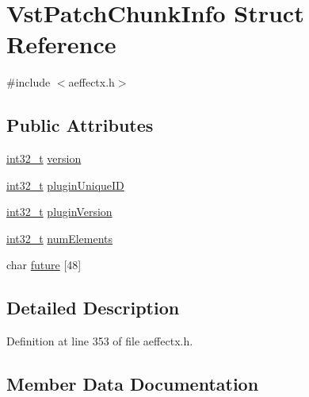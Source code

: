 \hypertarget{struct_vst_patch_chunk_info}{}\section{Vst\+Patch\+Chunk\+Info Struct Reference}
\label{struct_vst_patch_chunk_info}


{\ttfamily \#include $<$aeffectx.\+h$>$}

\subsection*{Public Attributes}
\begin{DoxyCompactItemize}
\item 
\hyperlink{lib-src_2ffmpeg_2win32_2stdint_8h_a37994e3b11c72957c6f454c6ec96d43d}{int32\+\_\+t} \hyperlink{struct_vst_patch_chunk_info_a09942223afdb9472fadab3247692cc1c}{version}
\item 
\hyperlink{lib-src_2ffmpeg_2win32_2stdint_8h_a37994e3b11c72957c6f454c6ec96d43d}{int32\+\_\+t} \hyperlink{struct_vst_patch_chunk_info_a7a968db1f6b30561989659502d10af61}{plugin\+Unique\+ID}
\item 
\hyperlink{lib-src_2ffmpeg_2win32_2stdint_8h_a37994e3b11c72957c6f454c6ec96d43d}{int32\+\_\+t} \hyperlink{struct_vst_patch_chunk_info_ade69ca2bcd8e9f93743380608009f4f3}{plugin\+Version}
\item 
\hyperlink{lib-src_2ffmpeg_2win32_2stdint_8h_a37994e3b11c72957c6f454c6ec96d43d}{int32\+\_\+t} \hyperlink{struct_vst_patch_chunk_info_aa8db76cc9a4a3c018bf8a96c09300a5e}{num\+Elements}
\item 
char \hyperlink{struct_vst_patch_chunk_info_af5bd20dc50aeebdda63c65d5573b4926}{future} \mbox{[}48\mbox{]}
\end{DoxyCompactItemize}


\subsection{Detailed Description}


Definition at line 353 of file aeffectx.\+h.



\subsection{Member Data Documentation}
